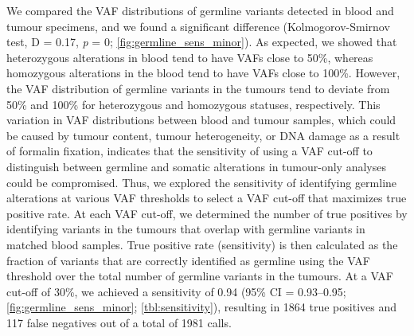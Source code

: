 We compared the VAF distributions of germline variants detected in blood and tumour specimens, and we found a significant difference (Kolmogorov-Smirnov test, D = 0.17, \textit{p} = 0; \autoref{fig:germline_sens_minor}). As expected, we showed that heterozygous alterations in blood tend to have VAFs close to 50\%, whereas homozygous alterations in the blood tend to have VAFs close to 100\%. However, the VAF distribution of germline variants in the tumours tend to deviate from 50\% and 100\% for heterozygous and homozygous statuses, respectively. This variation in VAF distributions between blood and tumour samples, which could be caused by tumour content, tumour heterogeneity, or DNA damage as a result of formalin fixation, indicates that the sensitivity of using a VAF cut-off to distinguish between germline and somatic alterations in tumour-only analyses could be compromised. Thus, we explored the sensitivity of identifying germline alterations at various VAF thresholds to select a VAF cut-off that maximizes true positive rate. At each VAF cut-off, we determined the number of true positives by identifying variants in the tumours that overlap with germline variants in matched blood samples. True positive rate (sensitivity) is then calculated as the fraction of variants that are correctly identified as germline using the VAF threshold over the total number of germline variants in the tumours. At a VAF cut-off of 30\%, we achieved a sensitivity of 0.94 (95\% CI = 0.93--0.95; \autoref{fig:germline_sens_minor}; \autoref{tbl:sensitivity}), resulting in 1864 true positives and 117 false negatives out of a total of 1981 calls.

